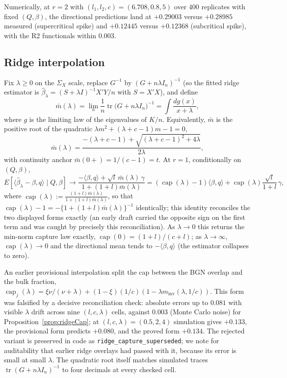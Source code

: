 Numerically, at $r=2$ with $(l_1,l_2,c)=(6.708,0.8,5)$ over 400 replicates with fixed $(Q,\beta)$, the directional predictions land at $+0.29003$ versus $+0.28985$ measured (supercritical spike) and $+0.12445$ versus $+0.12368$ (subcritical spike), with the R2 functionals within $0.003$.

\subsection{Ridge interpolation}\label{subsec:ridge}

\begin{proposition}\label{prop:ridgeCap}
Fix $\lambda\ge 0$ on the $\Sigma_X$ scale, replace $G^{-1}$ by $(G+n\lambda I_n)^{-1}$ (so the fitted ridge estimator is $\hat\beta_{\lambda}=(S+\lambda I)^{-1}X'Y/n$ with $S=X'X$), and define
\[
\bar m(\lambda)=\lim_{n}\frac1n\operatorname{tr}\bigl(G+n\lambda I_n\bigr)^{-1}
=\int\frac{dg(x)}{x+\lambda},
\]
where $g$ is the limiting law of the eigenvalues of $K/n$. Equivalently, $\bar m$ is the positive root of the quadratic $\lambda m^2+(\lambda+c-1)m-1=0$,
\[
\bar m(\lambda)=\frac{-(\lambda+c-1)+\sqrt{(\lambda+c-1)^2+4\lambda}}{2\lambda},
\]
with continuity anchor $\bar m(0+)=1/(c-1)=t$. At $r=1$, conditionally on $(Q,\beta)$,
\[
E[\langle\hat\beta_{\lambda}-\beta,q\rangle\mid Q,\beta]
\to\frac{-\langle\beta,q\rangle+\sqrt{l}\,\bar m(\lambda)\,\gamma}{1+(1+l)\bar m(\lambda)}
=(\operatorname{cap}(\lambda)-1)\langle\beta,q\rangle
+\operatorname{cap}(\lambda)\frac{\sqrt{l}}{1+l}\,\gamma,
\]
where $\displaystyle\operatorname{cap}(\lambda):=\frac{(1+l)\bar m(\lambda)}{1+(1+l)\bar m(\lambda)}$, so that $\operatorname{cap}(\lambda)-1=-\{1+(1+l)\bar m(\lambda)\}^{-1}$ identically; this identity reconciles the two displayed forms exactly (an early draft carried the opposite sign on the first term and was caught by precisely this reconciliation). As $\lambda\to 0$ this returns the min-norm capture law exactly, $\operatorname{cap}(0)=(1+l)/(c+l)$; as $\lambda\to\infty$, $\operatorname{cap}(\lambda)\to 0$ and the directional mean tends to $-\langle\beta,q\rangle$ (the estimator collapses to zero).
\end{proposition}

\begin{remark}
An earlier provisional interpolation split the cap between the BGN overlap and the bulk fraction, $\operatorname{cap}_j(\lambda)=\xi\nu/(\nu+\lambda)+(1-\xi)(1/c)(1-\lambda m_{\mathrm{inv}}(\lambda,1/c))$. This form was falsified by a decisive reconciliation check: absolute errors up to $0.081$ with visible $\lambda$ drift across nine $(l,c,\lambda)$ cells, against $0.003$ (Monte Carlo noise) for Proposition~\ref{prop:ridgeCap}; at $(l,c,\lambda)=(0.5,2,4)$ simulation gives $+0.133$, the provisional form predicts $+0.080$, and the proved form $+0.134$. The rejected variant is preserved in code as \texttt{ridge\_capture\_superseded}; we note for auditability that earlier ridge overlays had passed with it, because its error is small at small $\lambda$. The quadratic root itself matches simulated traces $\operatorname{tr}(G+n\lambda I_n)^{-1}$ to four decimals at every checked cell.
\end{remark}

